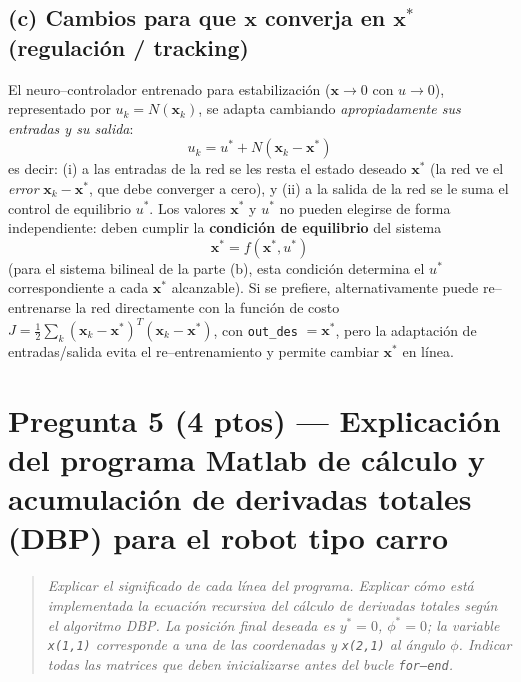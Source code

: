 \documentclass[11pt,a4paper]{article}
\newenvironment{enunciado}
{\begin{quote}\small\itshape\color{azulpucp}}
{\end{quote}}
\begin{document}
\subsection*{(c) Cambios para que $\mathbf x$ converja en $\mathbf x^{*}$ (regulación / tracking)}

El neuro--controlador entrenado para estabilización ($\mathbf x\to 0$ con $u\to 0$), representado por $u_k=N(\mathbf x_k)$, se adapta cambiando \emph{apropiadamente sus entradas y su salida}:
\begin{equation}
\boxed{\;u_k = u^{*} + N(\mathbf x_k-\mathbf x^{*})\;}
\end{equation}
es decir: (i) a las entradas de la red se les resta el estado deseado $\mathbf x^{*}$ (la red ve el \emph{error} $\mathbf x_k-\mathbf x^{*}$, que debe converger a cero), y (ii) a la salida de la red se le suma el control de equilibrio $u^{*}$. Los valores $\mathbf x^{*}$ y $u^{*}$ no pueden elegirse de forma independiente: deben cumplir la \textbf{condición de equilibrio} del sistema
\begin{equation}
\mathbf x^{*}=f(\mathbf x^{*},u^{*})
\end{equation}
(para el sistema bilineal de la parte (b), esta condición determina el $u^{*}$ correspondiente a cada $\mathbf x^{*}$ alcanzable). Si se prefiere, alternativamente puede re--entrenarse la red directamente con la función de costo $J=\frac12\sum_k(\mathbf x_k-\mathbf x^{*})^{T}(\mathbf x_k-\mathbf x^{*})$, con \texttt{out\_des} $=\mathbf x^{*}$, pero la adaptación de entradas/salida evita el re--entrenamiento y permite cambiar $\mathbf x^{*}$ en línea.

\clearpage
\section*{Pregunta 5 (4 ptos) — Explicación del programa Matlab de cálculo y acumulación de derivadas totales (DBP) para el robot tipo carro}

\begin{enunciado}
Explicar el significado de cada línea del programa. Explicar cómo está implementada la ecuación recursiva del cálculo de derivadas totales según el algoritmo DBP. La posición final deseada es $y^{*}=0$, $\phi^{*}=0$; la variable \texttt{x(1,1)} corresponde a una de las coordenadas y \texttt{x(2,1)} al ángulo $\phi$. Indicar todas las matrices que deben inicializarse antes del bucle \texttt{for--end}.
\end{enunciado}
\end{document}
